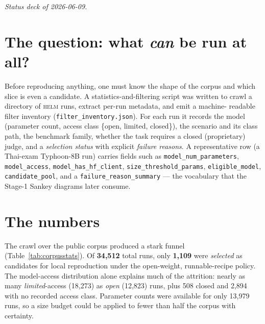 \documentclass[11pt]{report}
\newcommand{\code}[1]{\texttt{#1}}
\newcommand{\file}[1]{\texttt{#1}}
\begin{document}
\emph{Status deck of 2026-06-09.}

\section{The question: what \emph{can} be run at all?}

Before reproducing anything, one must know the shape of the corpus and which
slice is even a candidate. A statistics-and-filtering script was written to crawl
a directory of \textsc{helm} runs, extract per-run metadata, and emit a machine-
readable filter inventory (\file{filter\_inventory.json}). For each run it records
the model (parameter count, access class \{open, limited, closed\}), the scenario
and its class path, the benchmark family, whether the task requires a closed
(proprietary) judge, and a \emph{selection status} with explicit
\emph{failure reasons}. A representative row (a Thai-exam Typhoon-8B run) carries
fields such as \code{model\_num\_parameters}, \code{model\_access},
\code{model\_has\_hf\_client}, \code{size\_threshold\_params}, \code{eligible\_model},
\code{candidate\_pool}, and a \code{failure\_reason\_summary} --- the vocabulary
that the Stage-1 Sankey diagrams later consume.

\section{The numbers}

The crawl over the public corpus produced a stark funnel
(Table~\ref{tab:corpusstats}). Of \textbf{34{,}512} total runs, only
\textbf{1{,}109} were \emph{selected} as candidates for local reproduction under
the open-weight, runnable-recipe policy. The model-access distribution alone
explains much of the attrition: nearly as many \emph{limited}-access (18{,}273)
as \emph{open} (12{,}823) runs, plus 508 closed and 2{,}894 with no recorded
access class. Parameter counts were available for only 13{,}979 runs, so a size
budget could be applied to fewer than half the corpus with certainty.
\end{document}
